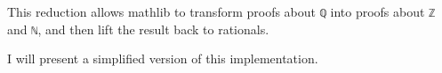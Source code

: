 This reduction allows mathlib to transform proofs about \lstinline[language=lean]|ℚ| 
into proofs about \lstinline[language=lean]|ℤ| and \lstinline[language=lean]|ℕ|, 
and then lift the result back to rationals.
\begin{example}
  I will present a simplified version of this implementation.



\end{example}

